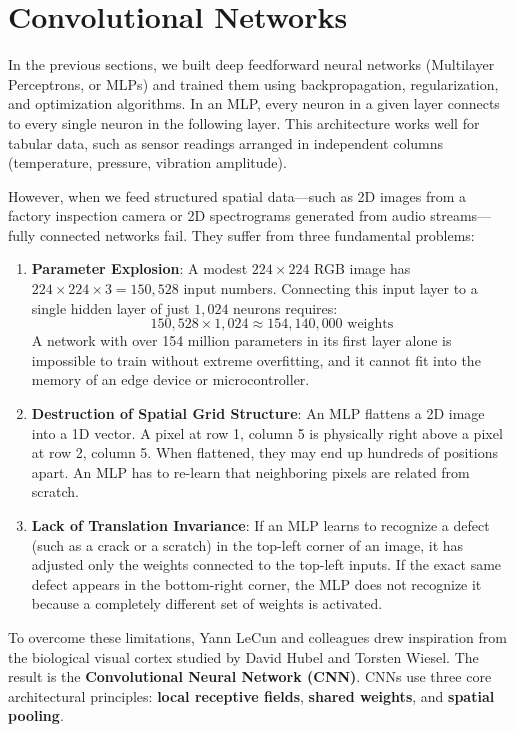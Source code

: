 \section{Convolutional Networks}\label{sec:cnn}

In the previous sections, we built deep feedforward neural networks (Multilayer Perceptrons, or MLPs) and trained them using backpropagation, regularization, and optimization algorithms. In an MLP, every neuron in a given layer connects to every single neuron in the following layer. This architecture works well for tabular data, such as sensor readings arranged in independent columns (temperature, pressure, vibration amplitude).

However, when we feed structured spatial data---such as 2D images from a factory inspection camera or 2D spectrograms generated from audio streams---fully connected networks fail. They suffer from three fundamental problems:
\begin{enumerate}
    \item \textbf{Parameter Explosion}: A modest $224 \times 224$ RGB image has $224 \times 224 \times 3 = 150{,}528$ input numbers. Connecting this input layer to a single hidden layer of just $1{,}024$ neurons requires:
    \begin{equation*}
    150{,}528 \times 1{,}024 \approx 154{,}140{,}000 \text{ weights}
    \end{equation*}
    A network with over 154 million parameters in its first layer alone is impossible to train without extreme overfitting, and it cannot fit into the memory of an edge device or microcontroller.
    \item \textbf{Destruction of Spatial Grid Structure}: An MLP flattens a 2D image into a 1D vector. A pixel at row 1, column 5 is physically right above a pixel at row 2, column 5. When flattened, they may end up hundreds of positions apart. An MLP has to re-learn that neighboring pixels are related from scratch.
    \item \textbf{Lack of Translation Invariance}: If an MLP learns to recognize a defect (such as a crack or a scratch) in the top-left corner of an image, it has adjusted only the weights connected to the top-left inputs. If the exact same defect appears in the bottom-right corner, the MLP does not recognize it because a completely different set of weights is activated.
\end{enumerate}

To overcome these limitations, Yann LeCun and colleagues drew inspiration from the biological visual cortex studied by David Hubel and Torsten Wiesel. The result is the \textbf{Convolutional Neural Network (CNN)}. CNNs use three core architectural principles: \textbf{local receptive fields}, \textbf{shared weights}, and \textbf{spatial pooling}.

